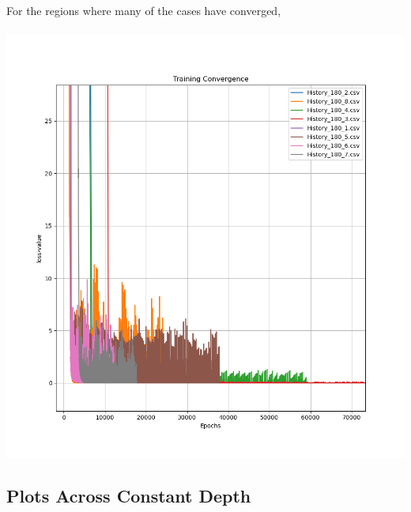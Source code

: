 \documentclass[a4paper, 12pt]{report}
\def\size{0.75}
\begin{document}
\begin{center}
\newpage
For the regions where many of the cases have converged,
\\~\\\includegraphics[scale=\size]{Width_180_Down.png}
\newpage
\subsection{Plots Across Constant Depth}

\end{center}
\end{document}
